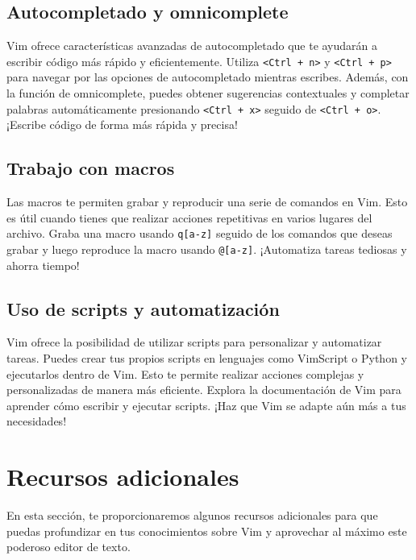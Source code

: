\documentclass[
  doc,
  floatsintext,
  longtable,
  a4paper,
  nolmodern,
  notxfonts,
  notimes,
  colorlinks=true,linkcolor=blue,citecolor=blue,urlcolor=blue]{apa7}
\begin{document}
\subsection{Autocompletado y
omnicomplete}\label{autocompletado-y-omnicomplete}

Vim ofrece características avanzadas de autocompletado que te ayudarán a
escribir código más rápido y eficientemente. Utiliza
\texttt{\textless{}Ctrl\ +\ n\textgreater{}} y
\texttt{\textless{}Ctrl\ +\ p\textgreater{}} para navegar por las
opciones de autocompletado mientras escribes. Además, con la función de
omnicomplete, puedes obtener sugerencias contextuales y completar
palabras automáticamente presionando
\texttt{\textless{}Ctrl\ +\ x\textgreater{}} seguido de
\texttt{\textless{}Ctrl\ +\ o\textgreater{}}. ¡Escribe código de forma
más rápida y precisa!

\subsection{Trabajo con macros}\label{trabajo-con-macros}

Las macros te permiten grabar y reproducir una serie de comandos en Vim.
Esto es útil cuando tienes que realizar acciones repetitivas en varios
lugares del archivo. Graba una macro usando \texttt{q{[}a-z{]}} seguido
de los comandos que deseas grabar y luego reproduce la macro usando
\texttt{@{[}a-z{]}}. ¡Automatiza tareas tediosas y ahorra tiempo!

\subsection{Uso de scripts y
automatización}\label{uso-de-scripts-y-automatizaciuxf3n}

Vim ofrece la posibilidad de utilizar scripts para personalizar y
automatizar tareas. Puedes crear tus propios scripts en lenguajes como
VimScript o Python y ejecutarlos dentro de Vim. Esto te permite realizar
acciones complejas y personalizadas de manera más eficiente. Explora la
documentación de Vim para aprender cómo escribir y ejecutar scripts.
¡Haz que Vim se adapte aún más a tus necesidades!

\section{Recursos adicionales}\label{recursos-adicionales}

En esta sección, te proporcionaremos algunos recursos adicionales para
que puedas profundizar en tus conocimientos sobre Vim y aprovechar al
máximo este poderoso editor de texto.
\end{document}
